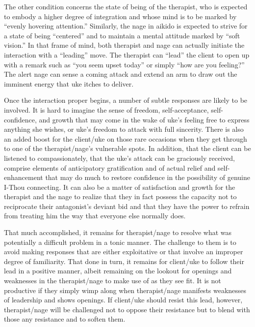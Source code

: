 The other condition concerns the state of being of the therapist, who is expected to embody a higher degree of integration and whose mind is to be marked by ``evenly hovering attention.'' Similarly, the nage in aikido is expected to strive for a state of being ``centered'' and to maintain a mental attitude marked by ``soft vision.'' In that frame of mind, both therapist and nage can actually initiate the interaction with a ``leading'' move. The therapist can ``lead'' the client to open up with a remark such as ``you seem upset today'' or simply ``how are you feeling?'' The alert nage can sense a coming attack and extend an arm to draw out the imminent energy that uke itches to deliver.

Once the interaction proper begins, a number of subtle responses are likely to be involved. It is hard to imagine the sense of freedom, self-acceptance, self-confidence, and growth that may come in the wake of uke's feeling free to express anything she wishes, or uke's freedom to attack with full sincerity.  There is also an added boost for the client/uke on those rare occasions when they get through to one of the therapist/nage's vulnerable spots. In addition, that the client can be listened to compassionately, that the uke's attack can be graciously received, comprise elements of anticipatory gratification and of actual relief and self-enhancement that may do much to restore confidence in the possibility of genuine I-Thou connecting. It can also be a matter of satisfaction and growth for the therapist and the nage to realize that they in fact possess the capacity not to reciprocate their antagonist's deviant bid and that they have the power to refrain from treating him the way that everyone else normally does. 

That much accomplished, it remains for therapist/nage to resolve what was potentially a difficult problem in a tonic manner. The challenge to them is to avoid making responses that are either exploitative or that involve an improper degree of familiarity. That done in turn, it remains for client/uke to follow their lead in a positive manner, albeit remaining on the lookout for openings and weaknesses in the therapist/nage to make use of as they see fit. It is not productive if they simply wimp along when therapist/nage manifests weaknesses of leadership and shows openings. If client/uke should resist this lead, however, therapist/nage will be challenged not to oppose their resistance but to blend with those any resistance and to soften them. 


